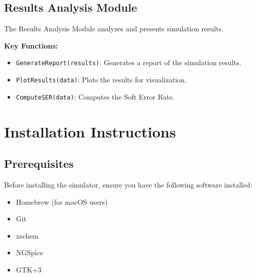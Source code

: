 \documentclass[12pt]{article}
\begin{document}
\subsection{Results Analysis Module}
The Results Analysis Module analyzes and presents simulation results.

\textbf{Key Functions:}
\begin{itemize}
    \item \texttt{GenerateReport(results)}: Generates a report of the simulation results.
    \item \texttt{PlotResults(data)}: Plots the results for visualization.
    \item \texttt{ComputeSER(data)}: Computes the Soft Error Rate.
\end{itemize}

\section{Installation Instructions}
\subsection{Prerequisites}
Before installing the simulator, ensure you have the following software installed:
\begin{itemize}
    \item Homebrew (for macOS users)
    \item Git
    \item xschem
    \item NGSpice
    \item GTK+3
\end{itemize}
\end{document}

